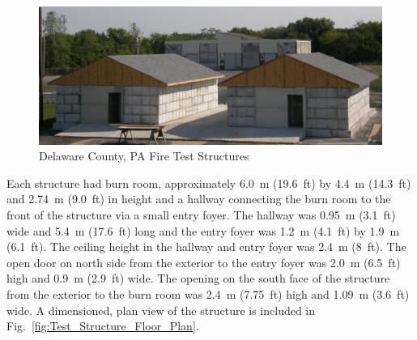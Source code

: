 \documentclass[12pt,oneside]{book}
\begin{document}
\begin{figure}[!ht]
	\includegraphics[width=6in]{../Figures/Pictures/DelCo_Structures}
	\caption{Delaware County, PA Fire Test Structures}
	\label{fig:Delaware_County,_PA_Fire_Test_Structures}
\end{figure}

Each structure had burn room, approximately 6.0~m (19.6~ft) by 4.4~m (14.3~ft) and 2.74~m (9.0~ft) in height and a hallway connecting the burn room to the front of the structure via a small entry foyer. The hallway was 0.95~m (3.1~ft) wide and 5.4~m (17.6~ft) long and the entry foyer was 1.2~m (4.1~ft) by 1.9~m (6.1~ft). The ceiling height in the hallway and entry foyer was 2.4~m (8~ft).  The open door on north side from the exterior to the entry foyer was 2.0~m (6.5~ft) high and 0.9~m (2.9~ft) wide. The opening on the south face of the structure from the exterior to the burn room was 2.4~m (7.75~ft) high and 1.09~m (3.6~ft) wide. A dimensioned, plan view of the structure is included in Fig.~\ref{fig:Test_Structure_Floor_Plan}.

\end{document}

